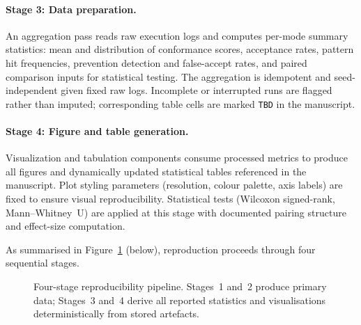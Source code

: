 \paragraph{Stage 3: Data preparation.}
An aggregation pass reads raw execution logs and computes per-mode
summary statistics: mean and distribution of conformance scores,
acceptance rates, pattern hit frequencies, prevention detection and
false-accept rates, and paired comparison inputs for statistical
testing.  The aggregation is idempotent and seed-independent given
fixed raw logs.  Incomplete or interrupted runs are flagged rather
than imputed; corresponding table cells are marked \texttt{TBD} in
the manuscript.

\paragraph{Stage 4: Figure and table generation.}
Visualization and tabulation components consume processed metrics to
produce all figures and dynamically updated statistical tables
referenced in the manuscript.  Plot styling parameters (resolution,
colour palette, axis labels) are fixed to ensure visual reproducibility.
Statistical tests (Wilcoxon signed-rank, Mann--Whitney~U) are applied
at this stage with documented pairing structure and effect-size
computation.

As summarised in Figure~\ref{fig:repro-pipeline} (below), reproduction proceeds through
four sequential stages.

\begin{figure}[htbp]
  \centering
  \caption{Four-stage reproducibility pipeline.  Stages~1 and~2 produce
    primary data; Stages~3 and~4 derive all reported statistics and
    visualisations deterministically from stored artefacts.}
  \label{fig:repro-pipeline}
\end{figure}

